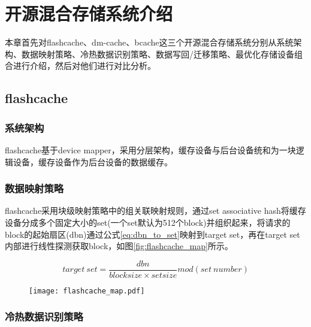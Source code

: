 
\chapter{开源混合存储系统介绍}
\label{chap:opensource_intro}

本章首先对flashcache、dm-cache、bcache这三个开源混合存储系统分别从系统架构、数据映射策略、冷热数据识别策略、数据写回/迁移策略、最优化存储设备组合进行介绍，然后对他们进行对比分析。

\section{flashcache}

\subsection{系统架构}

flashcache基于device mapper，采用分层架构，缓存设备与后台设备统和为一块逻辑设备，缓存设备作为后台设备的数据缓存。

\subsection{数据映射策略}
\label{flashcache_mapping}
flashcache采用块级映射策略中的组关联映射规则，通过set associative hash\cite{kimmel2014set}将缓存设备分成多个固定大小的set(一个set默认为512个block)并组织起来，将请求的block的起始扇区(dbn)通过公式\ref{eq:dbn_to_set}映射到target set，再在target set内部进行线性探测获取block，如图\ref{fig:flashcache_map}所示。

\begin{equation}
    \label{eq:dbn_to_set}
    target \ set = \frac{dbn}{block size \times set size} mod (set \  number)
\end{equation}

\begin{figure}[!htp]
    \centering
    \texttt{[image: flashcache\_map.pdf]}
\end{figure}

\subsection{冷热数据识别策略}

